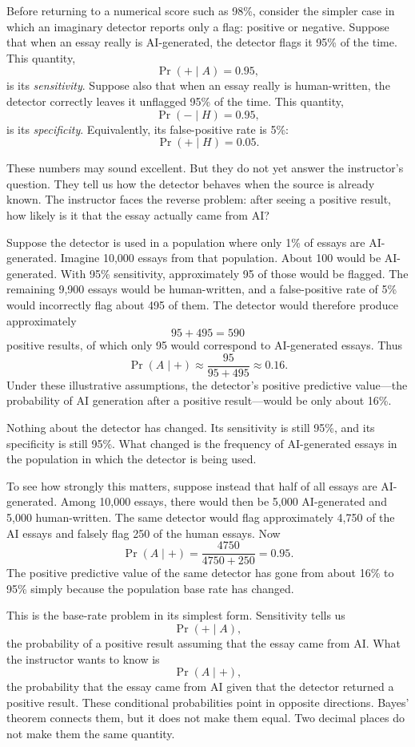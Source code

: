 \documentclass[pdflatex,sn-mathphys-num]{sn-jnl}
\begin{document}
Before returning to a numerical score such as 98\%, consider the simpler case in which an imaginary detector reports only a flag: positive or negative. Suppose that when an essay really is AI-generated, the detector flags it 95\% of the time. This quantity,
\[
\Pr(+\mid A)=0.95,
\]
is its \emph{sensitivity}. Suppose also that when an essay really is human-written, the detector correctly leaves it unflagged 95\% of the time. 
This quantity,
\[
\Pr(-\mid H)=0.95,
\]
is its \emph{specificity}. Equivalently, its false-positive rate is 5\%:
\[
\Pr(+\mid H)=0.05.
\]

These numbers may sound excellent. But they do not yet answer the instructor's question. They tell us how the detector behaves when the source 
is already known. The instructor faces the reverse problem: after seeing a positive result, how likely is it that the essay actually came from AI\@?

Suppose the detector is used in a population where only 1\% of essays are AI-generated. Imagine 10,000 essays from that population. About 
100 would be AI-generated. With 95\% sensitivity, approximately 95 of those would be flagged. The remaining 9,900 essays would be human-written, and a 
false-positive rate of 5\% would incorrectly flag about 495 of them. The detector would therefore produce approximately
\[
95+495=590
\]
positive results, of which only 95 would correspond to AI-generated essays. Thus
\[
\Pr(A\mid +)
\approx
\frac{95}{95+495}
\approx 0.16.
\]
Under these illustrative assumptions, the detector's positive predictive value---the probability of AI generation after a positive result---would be only about 16\%.

Nothing about the detector has changed. Its sensitivity is still 95\%, and its specificity is still 95\%. What changed is the frequency of 
AI-generated essays in the population in which the detector is being used.

To see how strongly this matters, suppose instead that half of all essays are AI-generated. Among 10,000 essays, there would then be 
5,000 AI-generated and 5,000 human-written. The same detector would flag approximately 4,750 of the AI essays and falsely flag 250
 of the human essays. Now
\[
\Pr(A\mid +)=\frac{4750}{4750+250}=0.95.
\]
The positive predictive value of the same detector has gone from about 16\% to 95\% simply because the population base rate has changed.

This is the base-rate problem in its simplest form. Sensitivity tells us
\[
\Pr(+\mid A),
\]
the probability of a positive result assuming that the essay came from AI\@. What the instructor wants to know is
\[
\Pr(A\mid +),
\]
the probability that the essay came from AI given that the detector returned a positive result. These conditional probabilities point in 
opposite directions. Bayes' theorem connects them, but it does not make them equal. Two decimal places do not make them the same quantity.
\end{document}
